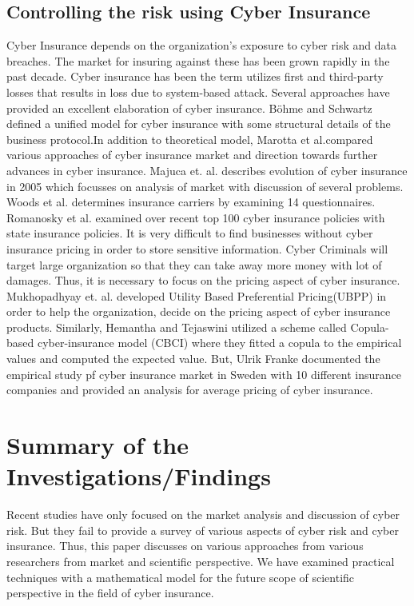 \documentclass[conference]{IEEEtran}
\begin{document}
    \subsection{Controlling the risk using Cyber Insurance}
    Cyber Insurance depends on the organization’s exposure to cyber risk and data breaches. The market for insuring against these has been  grown rapidly in the past decade. Cyber insurance has been the term utilizes first and third-party losses that results in loss due to system-based attack. Several approaches have provided an excellent elaboration of cyber insurance. Böhme and Schwartz\cite{b9} defined a unified model for cyber insurance with some structural details of the business protocol.In addition to theoretical model, Marotta et al.\cite{b10}compared various approaches of cyber insurance market and direction towards further advances in cyber insurance. Majuca et. al.\cite{b11} describes evolution of cyber insurance in 2005 which focusses on analysis of market with discussion of several problems. Woods et al.\cite{b12} determines insurance carriers by examining 14 questionnaires. 
    \\Romanosky et al. examined  over recent top 100 cyber insurance policies with state insurance policies\cite{b13}. It is very difficult to find businesses without cyber insurance pricing in order to store sensitive information. Cyber Criminals will target large organization so that they can take away more money with lot of damages. Thus, it is necessary to focus on the pricing aspect of cyber insurance. Mukhopadhyay et. al.\cite{b14} developed Utility Based Preferential Pricing(UBPP) in order to help the organization, decide on the pricing aspect of cyber insurance products. Similarly, Hemantha and Tejaswini\cite{b15} utilized a scheme called Copula-based cyber-insurance model (CBCI) where they fitted a copula to the empirical values and computed the expected value. But, Ulrik Franke\cite{b16} documented the empirical study pf cyber insurance market in Sweden with 10 different insurance companies and provided an analysis for average pricing of cyber insurance. 

\section{Summary of the Investigations/Findings}

Recent studies have only focused on the market analysis and discussion of cyber risk. But they fail to provide a survey of various aspects of cyber risk and cyber insurance. Thus, this paper discusses on various approaches from various researchers from market and scientific perspective. We have examined practical techniques with a mathematical model for the future scope of scientific perspective in the field of cyber insurance. 
\end{document}
